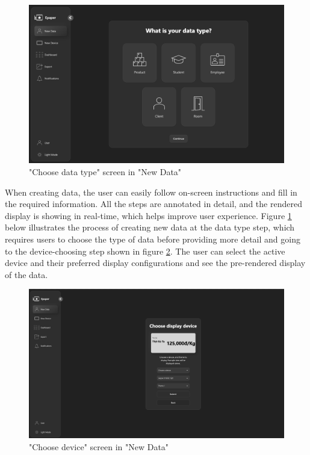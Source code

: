 \documentclass[../Main.tex]{subfiles}
\begin{document}
\begin{figure}[H]
    \centering
    \includegraphics[width=0.95\linewidth]{doc//imgs/ui_new-data-type.png}
    \caption{"Choose data type" screen in "New Data"}
    \label{fig:new-data-type}
\end{figure}


When creating data, the user can easily follow on-screen instructions and fill in the required information. All the steps are annotated in detail, and the rendered display is showing in real-time, which helps improve user experience. Figure \ref{fig:new-data-type} below illustrates the process of creating new data at the data type step, which requires users to choose the type of data before providing more detail and going to the device-choosing step shown in figure \ref{fig:new-data}. The user can select the active device and their preferred display configurations and see the pre-rendered display of the data.
\begin{figure}[H]
    \centering
    \includegraphics[width=0.95\linewidth]{doc//imgs/ui_new-data.png}
    \caption{"Choose device" screen in "New Data"}
    \label{fig:new-data}
\end{figure}
\end{document}
